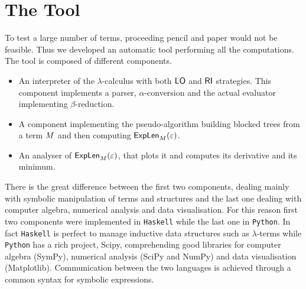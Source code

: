 \section{The Tool}
To test a large number of terms, proceeding pencil and paper would not be feasible. Thus we developed an automatic tool performing all the computations. The tool is composed of different components.
\begin{itemize}
	\item An interpreter of the $\lambda$-calculus with both $\textsf{LO}$ and $\textsf{RI}$ strategies. This component implements a parser, $\alpha$-conversion and the actual evaluator implementing $\beta$-reduction.
	\item A component implementing the pseudo-algorithm building blocked trees from a term $M$ and then computing $\textsf{ExpLen}_{M}(\varepsilon)$.
	\item An analyser of $\textsf{ExpLen}_{M}(\varepsilon)$, that plots it and computes its derivative and its minimum. 
\end{itemize}
There is the great difference between the first two components, dealing mainly with symbolic manipulation of terms and structures and the last one dealing with computer algebra, numerical analysis and data visualisation. For this reason first two components were implemented in \texttt{Haskell} while the last one in \texttt{Python}. In fact \texttt{Haskell} is perfect to manage inductive data structures such as $\lambda$-terms while \texttt{Python} has a rich project, \textsf{Scipy}, comprehending good libraries for computer algebra (\textsf{SymPy}), numerical analysis (\textsf{SciPy} and \textsf{NumPy}) and data visualisation (\textsf{Matplotlib}). Communication between the two languages is achieved through a common syntax for symbolic expressions.
